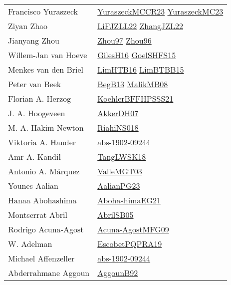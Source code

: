{\begin{longtable}{p{4cm}p{20cm}}
Francisco Yuraszeck & \href{articles/YuraszeckMCCR23.pdf}{YuraszeckMCCR23}\cite{YuraszeckMCCR23} \href{papers/YuraszeckMC23.pdf}{YuraszeckMC23}\cite{YuraszeckMC23} \\
Ziyan Zhao & \href{papers/LiFJZLL22.pdf}{LiFJZLL22}\cite{LiFJZLL22} \href{papers/ZhangJZL22.pdf}{ZhangJZL22}\cite{ZhangJZL22} \\
Jianyang Zhou & \href{articles/Zhou97.pdf}{Zhou97}\cite{Zhou97} \href{papers/Zhou96.pdf}{Zhou96}\cite{Zhou96} \\
Willem{-}Jan van Hoeve & \href{papers/GilesH16.pdf}{GilesH16}\cite{GilesH16} \href{articles/GoelSHFS15.pdf}{GoelSHFS15}\cite{GoelSHFS15} \\
Menkes van den Briel & \href{papers/LimHTB16.pdf}{LimHTB16}\cite{LimHTB16} \href{papers/LimBTBB15.pdf}{LimBTBB15}\cite{LimBTBB15} \\
Peter van Beek & \href{}{BegB13}\cite{BegB13} \href{}{MalikMB08}\cite{MalikMB08} \\
Florian A. Herzog & \href{articles/KoehlerBFFHPSSS21.pdf}{KoehlerBFFHPSSS21}\cite{KoehlerBFFHPSSS21} \\
J. A. Hoogeveen & \href{papers/AkkerDH07.pdf}{AkkerDH07}\cite{AkkerDH07} \\
M. A. Hakim Newton & \href{}{RiahiNS018}\cite{RiahiNS018} \\
Viktoria A. Hauder & \href{articles/abs-1902-09244.pdf}{abs-1902-09244}\cite{abs-1902-09244} \\
Amr A. Kandil & \href{}{TangLWSK18}\cite{TangLWSK18} \\
Antonio A. M{\'{a}}rquez & \href{papers/ValleMGT03.pdf}{ValleMGT03}\cite{ValleMGT03} \\
Younes Aalian & \href{papers/AalianPG23.pdf}{AalianPG23}\cite{AalianPG23} \\
Hanaa Abohashima & \href{articles/AbohashimaEG21.pdf}{AbohashimaEG21}\cite{AbohashimaEG21} \\
Montserrat Abril & \href{papers/AbrilSB05.pdf}{AbrilSB05}\cite{AbrilSB05} \\
Rodrigo Acuna{-}Agost & \href{papers/Acuna-AgostMFG09.pdf}{Acuna-AgostMFG09}\cite{Acuna-AgostMFG09} \\
W. Adelman & \href{articles/EscobetPQPRA19.pdf}{EscobetPQPRA19}\cite{EscobetPQPRA19} \\
Michael Affenzeller & \href{articles/abs-1902-09244.pdf}{abs-1902-09244}\cite{abs-1902-09244} \\
Abderrahmane Aggoun & \href{}{AggounB92}\cite{AggounB92} \\

\end{longtable}}

